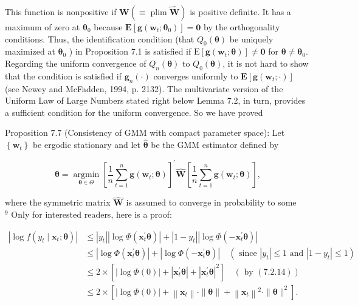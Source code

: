 \documentclass[10pt]{article}
\begin{document}
This function is nonpositive if $\mathbf{W}(\equiv \operatorname{plim} \widehat{\mathbf{W}})$ is positive definite. It has a maximum of zero at $\boldsymbol{\theta}_{0}$ because $\mathbf{E}\left[\mathbf{g}\left(\mathbf{w}_{t} ; \boldsymbol{\theta}_{0}\right)\right]=\mathbf{0}$ by the orthogonality conditions. Thus, the identification condition (that $Q_{0}(\boldsymbol{\theta})$ be uniquely maximized at $\boldsymbol{\theta}_{0}$ ) in Proposition 7.1 is satisfied if $\mathrm{E}\left[\mathbf{g}\left(\mathbf{w}_{t} ; \boldsymbol{\theta}\right)\right] \neq \mathbf{0}$ for $\boldsymbol{\theta} \neq \boldsymbol{\theta}_{0}$. Regarding the uniform convergence of $Q_{n}(\boldsymbol{\theta})$ to $Q_{0}(\boldsymbol{\theta})$, it is not hard to show that the condition is satisfied if $\mathbf{g}_{n}(\cdot)$ converges uniformly to $\mathbf{E}\left[\mathbf{g}\left(\mathbf{w}_{t} ; \cdot\right)\right]$ (see Newey and McFadden, 1994, p. 2132). The multivariate version of the Uniform Law of Large Numbers stated right below Lemma 7.2, in turn, provides a sufficient condition for the uniform convergence. So we have proved

Proposition 7.7 (Consistency of GMM with compact parameter space): Let $\left\{\mathbf{w}_{t}\right\}$ be ergodic stationary and let $\hat{\boldsymbol{\theta}}$ be the GMM estimator defined by

$$
\hat{\boldsymbol{\theta}}=\underset{\boldsymbol{\theta} \in \Theta}{\operatorname{argmin}}\left[\frac{1}{n} \sum_{t=1}^{n} \mathbf{g}\left(\mathbf{w}_{t} ; \boldsymbol{\theta}\right)\right]^{\prime} \widehat{\mathbf{W}}\left[\frac{1}{n} \sum_{t=1}^{n} \mathbf{g}\left(\mathbf{w}_{t} ; \boldsymbol{\theta}\right)\right],
$$

where the symmetric matrix $\widehat{\mathbf{W}}$ is assumed to converge in probability to some\\
${ }^{9}$ Only for interested readers, here is a proof:

$$
\begin{aligned}
\left|\log f\left(y_{t} \mid \mathbf{x}_{t} ; \boldsymbol{\theta}\right)\right| & \leq\left|y_{t}\right|\left|\log \Phi\left(\mathbf{x}_{t}^{\prime} \boldsymbol{\theta}\right)\right|+\left|1-y_{t}\right|\left|\log \Phi\left(-\mathbf{x}_{t}^{\prime} \boldsymbol{\theta}\right)\right| \\
& \leq\left|\log \Phi\left(\mathbf{x}_{t}^{\prime} \boldsymbol{\theta}\right)\right|+\left|\log \Phi\left(-\mathbf{x}_{t}^{\prime} \boldsymbol{\theta}\right)\right| \quad\left(\text { since }\left|y_{t}\right| \leq 1 \text { and }\left|1-y_{t}\right| \leq 1\right) \\
& \leq 2 \times\left[|\log \Phi(0)|+\left|\mathbf{x}_{t}^{\prime} \boldsymbol{\theta}\right|+\left|\mathbf{x}_{t}^{\prime} \boldsymbol{\theta}\right|^{2}\right] \quad(\text { by }(7.2 .14)) \\
& \leq 2 \times\left[|\log \Phi(0)|+\left\|\mathbf{x}_{t}\right\| \cdot\|\boldsymbol{\theta}\|+\left\|\mathbf{x}_{t}\right\|^{2} \cdot\|\boldsymbol{\theta}\|^{2}\right] .
\end{aligned}
$$
\end{document}
